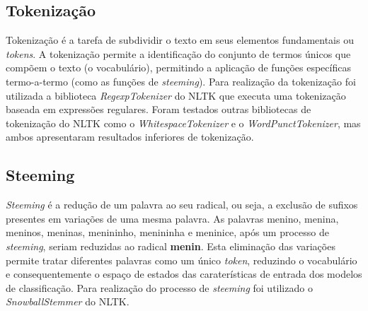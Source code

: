 \subsection{Tokenização}

Tokenização é a tarefa de subdividir o texto em seus elementos fundamentais ou \textit{tokens}. A tokenização permite a identificação do conjunto de termos únicos que compõem o texto (o vocabulário), permitindo a aplicação de funções específicas termo-a-termo (como as funções de \textit{steeming}). Para realização da tokenização foi utilizada a biblioteca \textit{RegexpTokenizer} do NLTK que executa uma tokenização baseada em expressões regulares. Foram testados outras bibliotecas de tokenização do NLTK como o \textit{WhitespaceTokenizer} e o \textit{WordPunctTokenizer}, mas ambos apresentaram resultados inferiores de tokenização.

\subsection{Steeming}

\textit{Steeming} é a redução de um palavra ao seu radical, ou seja, a exclusão de sufixos presentes em variações de uma mesma palavra. As palavras menino, menina, meninos,  meninas, menininho, menininha e meninice, após um processo de \textit{steeming}, seriam reduzidas ao radical \textbf{menin}. Esta eliminação das variações permite tratar diferentes palavras como um único \textit{token}, reduzindo o vocabulário e consequentemente o espaço de estados das caraterísticas de entrada dos modelos de classificação. Para realização do processo de \textit{steeming} foi utilizado o \textit{SnowballStemmer} do NLTK.